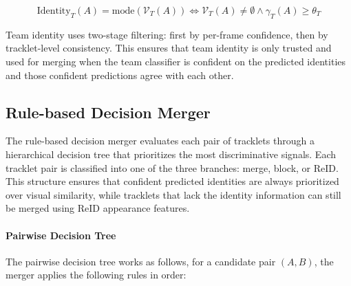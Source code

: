 \begin{equation}
    \text{Identity}_T(A) = \text{mode}(\mathcal{V}_T(A)) \iff \mathcal{V}_T(A) \neq \emptyset \land \gamma_T(A) \geq \theta_T
\end{equation}

Team identity uses two-stage filtering: first by per-frame confidence, then by tracklet-level consistency. This ensures that team identity is only trusted and used for merging when the team classifier is confident on the predicted identities and those confident predictions agree with each other.

\subsection{Rule-based Decision Merger}
The rule-based decision merger evaluates each pair of tracklets through a hierarchical decision tree that prioritizes the most discriminative signals. Each tracklet pair is classified into one of the three branches: merge, block, or ReID. This structure ensures that confident predicted identities are always prioritized over visual similarity, while tracklets that lack the identity information can still be merged using ReID appearance features.




\paragraph{Pairwise Decision Tree}
The pairwise decision tree works as follows, for a candidate pair $(A,B)$, the merger applies the following rules in order:

